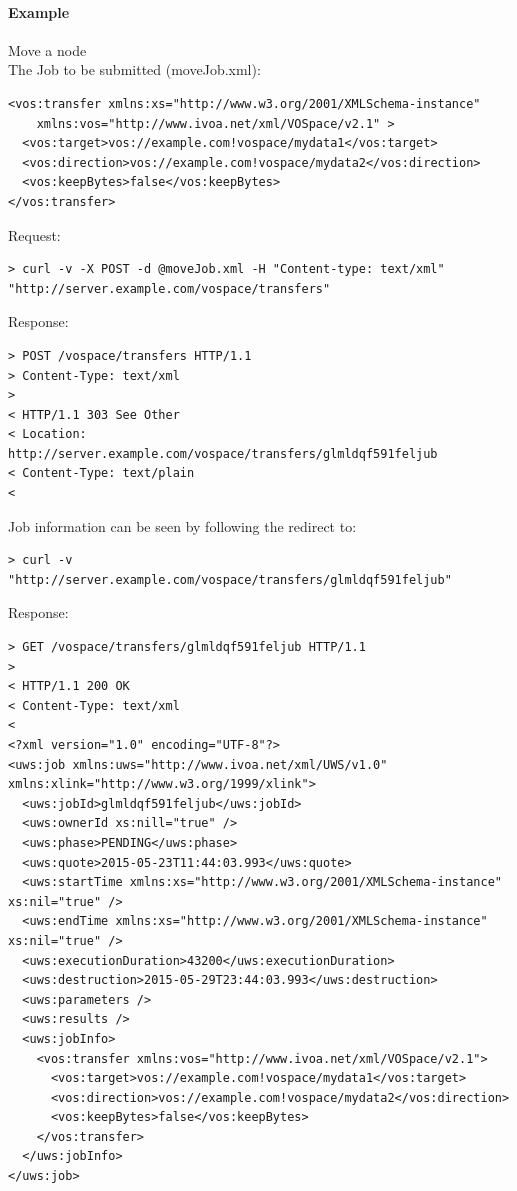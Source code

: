 \documentclass[11pt,a4paper]{ivoa}
\begin{document}
\paragraph{Example}
Move a node
\\[5px]
\noindent
The Job to be submitted (moveJob.xml):
\begin{lstlisting}
<vos:transfer xmlns:xs="http://www.w3.org/2001/XMLSchema-instance"
    xmlns:vos="http://www.ivoa.net/xml/VOSpace/v2.1" >
  <vos:target>vos://example.com!vospace/mydata1</vos:target>
  <vos:direction>vos://example.com!vospace/mydata2</vos:direction>
  <vos:keepBytes>false</vos:keepBytes>
</vos:transfer>
\end{lstlisting}
Request:
\begin{lstlisting}
> curl -v -X POST -d @moveJob.xml -H "Content-type: text/xml" "http://server.example.com/vospace/transfers"
\end{lstlisting}
Response:
\begin{lstlisting}
> POST /vospace/transfers HTTP/1.1
> Content-Type: text/xml
>
< HTTP/1.1 303 See Other
< Location: http://server.example.com/vospace/transfers/glmldqf591feljub
< Content-Type: text/plain
<
\end{lstlisting}
Job information can be seen by following the redirect to:
\begin{lstlisting}
> curl -v "http://server.example.com/vospace/transfers/glmldqf591feljub"
\end{lstlisting}
Response:
\begin{lstlisting}
> GET /vospace/transfers/glmldqf591feljub HTTP/1.1
>
< HTTP/1.1 200 OK
< Content-Type: text/xml
<
<?xml version="1.0" encoding="UTF-8"?>
<uws:job xmlns:uws="http://www.ivoa.net/xml/UWS/v1.0" xmlns:xlink="http://www.w3.org/1999/xlink">
  <uws:jobId>glmldqf591feljub</uws:jobId>
  <uws:ownerId xs:nill="true" />
  <uws:phase>PENDING</uws:phase>
  <uws:quote>2015-05-23T11:44:03.993</uws:quote>
  <uws:startTime xmlns:xs="http://www.w3.org/2001/XMLSchema-instance" xs:nil="true" />
  <uws:endTime xmlns:xs="http://www.w3.org/2001/XMLSchema-instance" xs:nil="true" />
  <uws:executionDuration>43200</uws:executionDuration>
  <uws:destruction>2015-05-29T23:44:03.993</uws:destruction>
  <uws:parameters />
  <uws:results />
  <uws:jobInfo>
    <vos:transfer xmlns:vos="http://www.ivoa.net/xml/VOSpace/v2.1">
      <vos:target>vos://example.com!vospace/mydata1</vos:target>
      <vos:direction>vos://example.com!vospace/mydata2</vos:direction>
      <vos:keepBytes>false</vos:keepBytes>
    </vos:transfer>
  </uws:jobInfo>
</uws:job>
\end{lstlisting}
\end{document}
